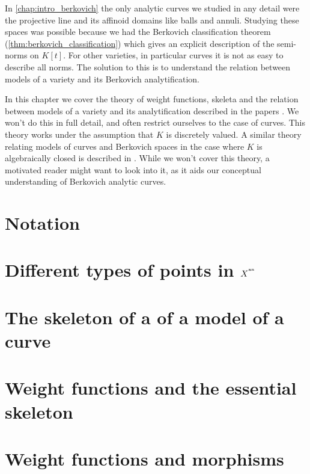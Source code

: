 In \cref{chap:intro_berkovich} the only analytic curves we studied in any detail were the projective line and its affinoid domains like balls and annuli.
Studying these spaces was possible because we had the Berkovich classification  theorem (\cref{thm:berkovich_classification}) which gives an explicit description of the semi-norms on $K[t]$. 
For other varieties, in particular curves it is not as easy to describe all norms.
The solution to this is to understand the relation between models of a variety and its Berkovich analytification. 


In this chapter we cover the theory of weight functions, skeleta and the relation between models of a variety and its analytification described in the papers \cite{mustataWeightFunctionsNonArchimedean2015, nicaiseBerkovichSkeletaBirational2016, bakerWeightFunctionsBerkovich2016}.
We won't do this in full detail, and often restrict ourselves to the case of curves.
This theory works under the assumption that $K$ is discretely valued. 
A similar theory relating models of curves and Berkovich spaces in the case where $K$ is algebraically closed is described in \cite{bakerStructureNonarchimedeanAnalytic2013}. 
While we won't cover this theory, a motivated reader might want to look into it, as it aids our conceptual understanding of Berkovich analytic curves.  



\section{Notation} \label{sec:notation}


\section{Different types of points in $X^{{}^{\text{an}}}$} \label{sec:different_types_of_points_in_xan}


\section{The skeleton of a of a model of a curve} \label{sec:the_dual_graph_of_a_model_of_a_curve}



\section{Weight functions and the essential skeleton} \label{sec:weight_functions}


\section{Weight functions and morphisms} \label{sec:weight_functions_and_morphisms}



